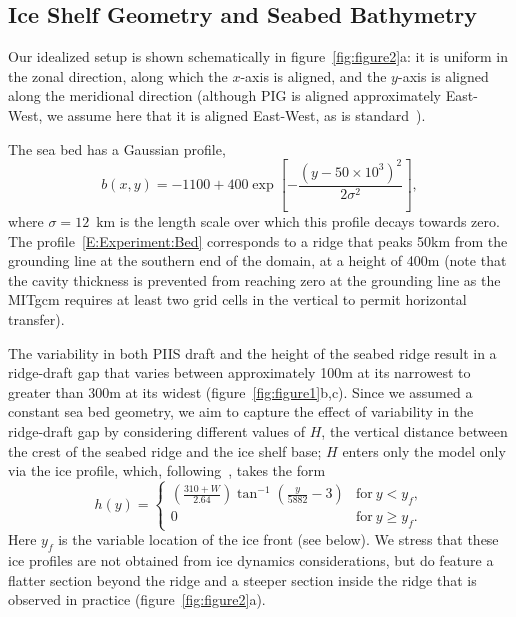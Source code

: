 \documentclass[draft]{agujournal2019}
\begin{document}
\subsection{Ice Shelf Geometry and Seabed Bathymetry}\label{S:Experiment:Geometry}
Our idealized setup is shown schematically in figure~\ref{fig:figure2}a: it is uniform in the zonal direction, along which the $x$-axis is aligned, and the $y$-axis is aligned along the meridional direction (although PIG is aligned approximately East-West, we assume here that it is aligned East-West, as is standard~\cite{Grosfeld1997JGROceans, DeRydt2014JGeophysResOceans}).

The sea bed has a Gaussian profile,
\begin{equation}\label{E:Experiment:Bed}
    b(x,y) = -1100 + 400 \exp\left[-\frac{\left(y - 50\times 10^3\right)^2}{2\sigma^2}\right],
\end{equation}
where $\sigma = 12$~km is the length scale over which this profile decays towards zero. The profile~\eqref{E:Experiment:Bed} corresponds to a ridge that peaks 50km from the grounding line at the southern end of the domain, at a height of 400m (note that the cavity thickness is prevented from reaching zero at the grounding line as the MITgcm requires at least two grid cells in the vertical to permit horizontal transfer). 

The variability in both PIIS draft and the height of the seabed ridge result in a ridge-draft gap that varies between approximately 100m at its narrowest to greater than 300m at its widest (figure~\ref{fig:figure1}b,c). Since we assumed a constant sea bed geometry, we aim to capture the effect of variability in the ridge-draft gap by considering different values of $H$, the vertical distance between the crest of the seabed ridge and the ice shelf base; $H$ enters only the model only via the ice profile, which, following~, takes the form
\begin{equation}
    h(y) = \begin{cases}
    \left(\frac{310 + W}{2.64}\right)\tan^{-1}\left(\frac{y}{5882} -3\right) & \text{for}~y < y_f,\\
    0  & \text{for}~y \geq y_f.
    \end{cases}
\end{equation}
Here $y_f$ is the variable location of the ice front (see below). We stress that these ice profiles are not obtained from ice dynamics considerations, but do feature a flatter section beyond the ridge and a steeper section inside the ridge that is observed in practice (figure~\ref{fig:figure2}a).
\end{document}
